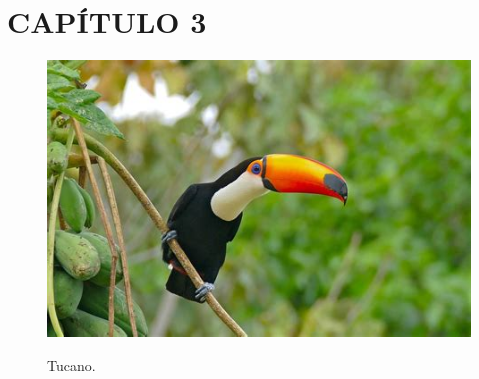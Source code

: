 \documentclass[
    12pt,				%
    a4paper,            %
    oneside,			%
    openright,			%
    ruledheader,
    anapcustomindent,
    sumario = tradicional,
    abntfigtabnum,
    tocpage=plain,
    english,			%
	brazil,				%
    ]{abntex-ifrn/abntex2-trabalho} %
\begin{document}
    


    
\chapter{CAPÍTULO 3}

    \lipsum[4]
    
    \begin{figure}[htpb]
        \centering
        \caption{Tucano.}
        \includegraphics[width=.5\textwidth]{imagem/tucano.jpg}
        \label{fig:tucano}
    \end{figure}

    \lipsum[5]

\postextual


\printbibliography[title={REFERÊNCIAS}] %




\end{document}
